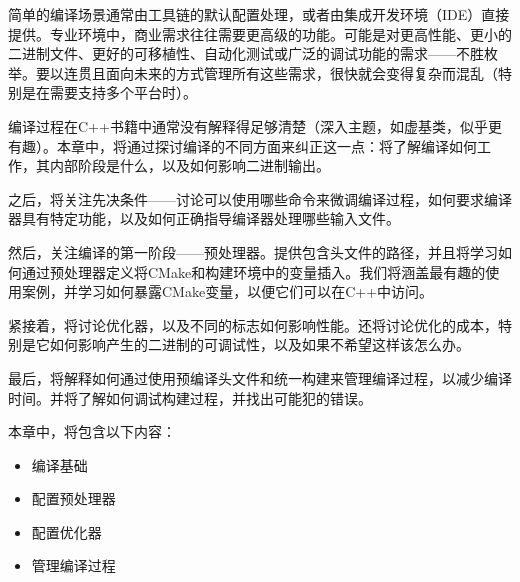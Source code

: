 简单的编译场景通常由工具链的默认配置处理，或者由集成开发环境（IDE）直接提供。专业环境中，商业需求往往需要更高级的功能。可能是对更高性能、更小的二进制文件、更好的可移植性、自动化测试或广泛的调试功能的需求——不胜枚举。要以连贯且面向未来的方式管理所有这些需求，很快就会变得复杂而混乱（特别是在需要支持多个平台时）。

编译过程在C++书籍中通常没有解释得足够清楚（深入主题，如虚基类，似乎更有趣）。本章中，将通过探讨编译的不同方面来纠正这一点：将了解编译如何工作，其内部阶段是什么，以及如何影响二进制输出。

之后，将关注先决条件——讨论可以使用哪些命令来微调编译过程，如何要求编译器具有特定功能，以及如何正确指导编译器处理哪些输入文件。

然后，关注编译的第一阶段——预处理器。提供包含头文件的路径，并且将学习如何通过预处理器定义将CMake和构建环境中的变量插入。我们将涵盖最有趣的使用案例，并学习如何暴露CMake变量，以便它们可以在C++中访问。

紧接着，将讨论优化器，以及不同的标志如何影响性能。还将讨论优化的成本，特别是它如何影响产生的二进制的可调试性，以及如果不希望这样该怎么办。

最后，将解释如何通过使用预编译头文件和统一构建来管理编译过程，以减少编译时间。并将了解如何调试构建过程，并找出可能犯的错误。

本章中，将包含以下内容：

\begin{itemize}
\item
编译基础

\item
配置预处理器

\item
配置优化器

\item
管理编译过程
\end{itemize}






